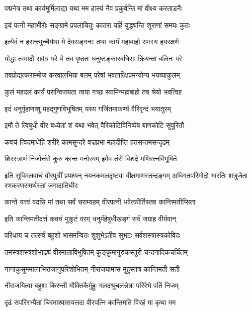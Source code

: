 \twolineshloka
{पद्मनेत्र तथा कार्यमूर्मिलाद्या यथा मम}
{हास्यं नैव प्रकुर्वन्ति मां वीक्ष्य करताडनैः}%

\twolineshloka
{इयं पत्नी महाभीरोः सङ्ग्रामे प्रपलायितुः}
{कातरा यर्हि युद्ध्यन्ति शूराणां समयः कुतः}%

\twolineshloka
{इत्येवं न हसन्त्युच्चैर्यथा मे देवराङ्गनाः}
{तथा कार्यं महाबाहो रामस्य हयरक्षणे}%

\twolineshloka
{योद्धा त्वमादौ सर्वत्र परे ये तव पृष्ठतः}
{धनुष्टङ्कारबधिराः क्रियन्तां बलिनः परे}%

\twolineshloka
{तवप्रोद्यत्कराम्भोज करवालभिया बलम्}
{परेषां भवतात्क्षिप्रमन्योन्य भयव्याकुलम्}%

\twolineshloka
{कुलं महदलं कार्यं परान्विजयता त्वया}
{गच्छ स्वामिन्महाबाहो तव श्रेयो भवत्विह}%

\twolineshloka
{इदं धनुर्गृहाणाशु महद्गुणविभूषितम्}
{यस्य गर्जितमाकर्ण्य वैरिवृन्दं भयातुरम्}%

\twolineshloka
{इमौ ते त्विषुधी वीर बध्येतां शं यथा भवेत्}
{वैरिकोटिविनिष्पेष बाणकोटि सुपूरितौ}%

\twolineshloka
{कवचं त्विदमाधेहि शरीरे कामसुन्दरे}
{वज्रप्रभा महादीप्ति हतसन्तमसन्दृढम्}%

\twolineshloka
{शिरस्त्राणं निजोत्तंसे कुरु कान्त मनोरमम्}
{इमेव तंसे विशदे मणिरत्नविभूषिते}%

\fourlineindentedshloka
{इति सुविमलवाचं वीरपुत्रीं प्रपश्यन्}
{नयनकमलदृष्ट्या वीक्षमाणस्तन्दङ्गम्}
{अधिगतपरिमोदो भारतिः शत्रुजेता}
{रणकरणसमर्थस्तां जगादातिधीरः}%


\twolineshloka
{कान्ते यत्त्वं वदसि मां तथा सर्वं चराम्यहम्}
{वीरपत्नी भवेत्कीर्तिस्तव कान्तिमतीप्सिता}%

\twolineshloka
{इति कान्तिमतीदत्तं कवचं मुकुटं वरम्}
{धनुर्महेषुधीखड्गं सर्वं जग्राह वीर्यवान्}%

\twolineshloka
{परिधाय च तत्सर्वं बहुशो भासमन्वितः}
{शुशुभेऽतीव सुभटः सर्वशस्त्रास्त्रकोविदः}%

\twolineshloka
{तमस्त्रशस्त्रशोभाढ्यं वीरमालाविभूषितम्}
{कुङ्कुमागुरुकस्तूरी चन्दनादिकचर्चितम्}%

\twolineshloka
{नानाकुसुममालाभिराजानुपरिशोभितम्}
{नीराजयामास मुहुस्तत्र कान्तिमती सती}%

\twolineshloka
{नीराजयित्वा बहुशः किरन्ती मौक्तिकैर्मुहुः}
{गलदश्रुचलन्नेत्रा परिरेभे पतिं निजम्}%

\twolineshloka
{दृढं सपरिरभ्यैतां चिरमाश्वासयत्तदा}
{वीरपत्नि कान्तिमति विरहं मा कृथा मम}%

